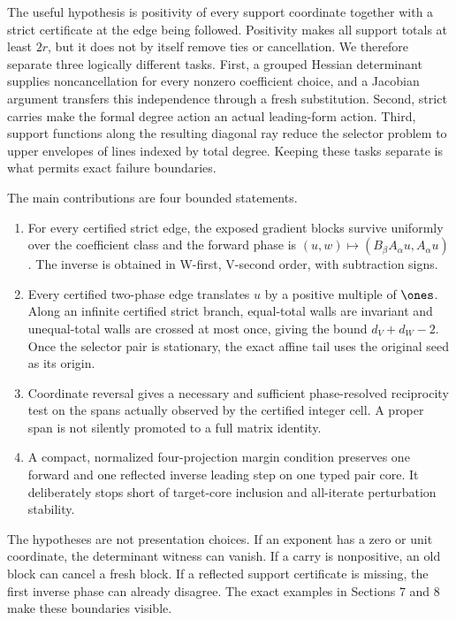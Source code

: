 \documentclass[11pt]{article}
\theoremstyle{definition}
\theoremstyle{remark}
\begin{document}
The useful hypothesis is positivity of every support coordinate together
with a strict certificate at the edge being followed.  Positivity makes all
support totals at least $2r$, but it does not by itself remove ties or
cancellation.  We therefore separate three logically different tasks.
First, a grouped Hessian determinant supplies noncancellation for every
nonzero coefficient choice, and a Jacobian argument transfers this
independence through a fresh substitution.  Second, strict carries make the
formal degree action an actual leading-form action.  Third, support
functions along the resulting diagonal ray reduce the selector problem to
upper envelopes of lines indexed by total degree.  Keeping these tasks
separate is what permits exact failure boundaries.

The main contributions are four bounded statements.

\begin{enumerate}[leftmargin=2em]
\item For every certified strict edge, the exposed gradient blocks survive
  uniformly over the coefficient class and the forward phase is
  $(u,w)\mapsto(B_\beta A_\alpha u,A_\alpha u)$.  The inverse is obtained in
  W-first, V-second order, with subtraction signs.
\item Every certified two-phase edge translates $u$ by a positive multiple
  of $\ones$.  Along an infinite certified strict branch, equal-total walls
  are invariant and unequal-total walls are crossed at most once, giving the
  bound $d_V+d_W-2$.  Once the selector pair is stationary, the exact
  affine tail uses the original seed as its origin.
\item Coordinate reversal gives a necessary and sufficient phase-resolved
  reciprocity test on the spans actually observed by the certified integer
  cell.  A proper span is not silently promoted to a full matrix identity.
\item A compact, normalized four-projection margin condition preserves one
  forward and one reflected inverse leading step on one typed pair core.
  It deliberately stops short of target-core inclusion and all-iterate
  perturbation stability.
\end{enumerate}

The hypotheses are not presentation choices.  If an exponent has a zero or
unit coordinate, the determinant witness can vanish.  If a carry is
nonpositive, an old block can cancel a fresh block.  If a reflected support
certificate is missing, the first inverse phase can already disagree.  The
exact examples in Sections 7 and 8 make these boundaries visible.
\end{document}
